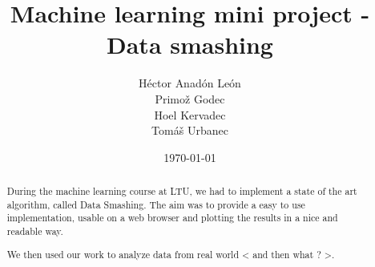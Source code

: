 \documentclass[a4paper]{article}
\title{Machine learning mini project - Data smashing}
\author
{
	Héctor {\sc Anadón León}\\
    Primož {\sc Godec}\\
    Hoel {\sc Kervadec}\\
    Tomáš {\sc Urbanec}
}
\date{\today}
\begin{document}
    \maketitle

    \begin{abstract}
        During the machine learning course at LTU, we had to implement a state of the art algorithm, called Data Smashing. The aim was to provide a easy to use implementation, usable on a web browser and plotting the results in a nice and readable way.

        We then used our work to analyze data from real world < and then what ? >.
    \end{abstract}
    
    \tableofcontents
    \setlength{\parskip}{10pt}
    
    

    

    

    

    

    
    
\end{document}
